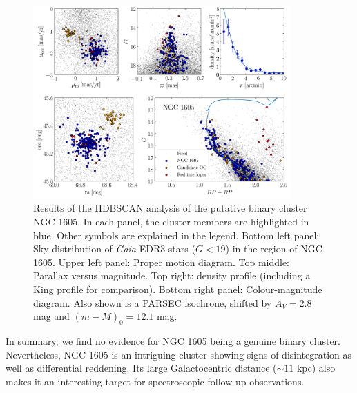 \documentclass[RNAAS]{aastex631}
\begin{document}
\begin{figure}
\begin{center}
\includegraphics[width=0.88\textwidth,angle=0]{im/ngc1605_hdbscan_analysis.png}
\caption{Results of the HDBSCAN analysis of the putative binary cluster NGC 1605. In each panel, the cluster members are highlighted in blue. Other symbols are explained in the legend. Bottom left panel: Sky distribution of {\it Gaia} EDR3 stars ($G<19$) in the region of NGC 1605. Upper left panel: Proper motion diagram. Top middle: Parallax versus magnitude. Top right: density profile (including a King profile for comparison). Bottom right panel: Colour-magnitude diagram. Also shown is a PARSEC isochrone, shifted by $A_V=2.8$ mag and $(m-M)_0=12.1$ mag. \label{fig:1}}
\end{center}
\end{figure}

In summary, we find no evidence for NGC 1605 being a genuine binary cluster. 
Nevertheless, NGC 1605 is an intriguing cluster showing signs of disintegration as well as differential reddening. Its large Galactocentric distance ($\sim 11$ kpc) also makes it an interesting target for spectroscopic follow-up observations. 


{}

\end{document}
